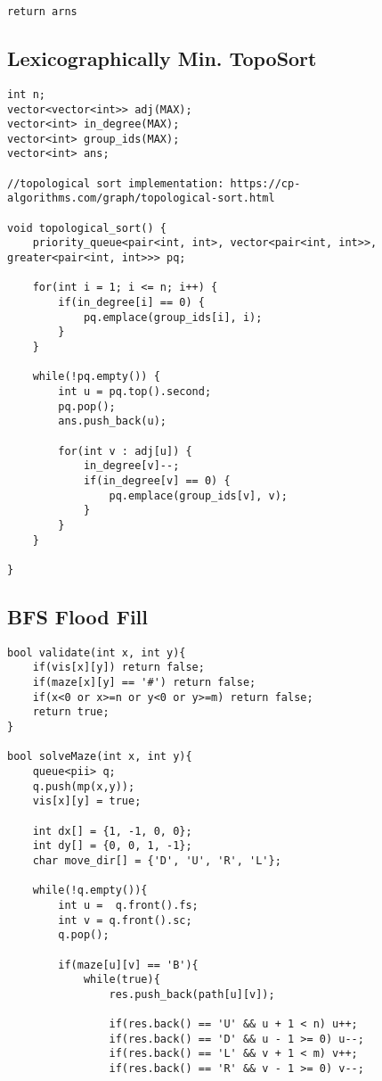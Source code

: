 \documentclass[10pt]{article}
\begin{document}
\begin{multicols*}{2}
\begin{lstlisting}[style=compactcpp]
        return arns
\end{lstlisting}

\subsection{Lexicographically Min. TopoSort}

\begin{lstlisting}[style=compactcpp]
int n;
vector<vector<int>> adj(MAX);
vector<int> in_degree(MAX);
vector<int> group_ids(MAX);
vector<int> ans;

//topological sort implementation: https://cp-algorithms.com/graph/topological-sort.html

void topological_sort() {
    priority_queue<pair<int, int>, vector<pair<int, int>>, greater<pair<int, int>>> pq;

    for(int i = 1; i <= n; i++) {
        if(in_degree[i] == 0) {
            pq.emplace(group_ids[i], i);
        }
    }

    while(!pq.empty()) {
        int u = pq.top().second;
        pq.pop();
        ans.push_back(u);

        for(int v : adj[u]) {
            in_degree[v]--;
            if(in_degree[v] == 0) {
                pq.emplace(group_ids[v], v);
            }
        }
    }

}
\end{lstlisting}

\subsection{BFS Flood Fill}

\begin{lstlisting}[style=compactcpp]
    bool validate(int x, int y){
	if(vis[x][y]) return false;
	if(maze[x][y] == '#') return false;
	if(x<0 or x>=n or y<0 or y>=m) return false;
	return true;
}
 
bool solveMaze(int x, int y){
    queue<pii> q;
    q.push(mp(x,y));
    vis[x][y] = true;

    int dx[] = {1, -1, 0, 0};
    int dy[] = {0, 0, 1, -1};
    char move_dir[] = {'D', 'U', 'R', 'L'};
 
	while(!q.empty()){
		int u =  q.front().fs;
		int v = q.front().sc;
		q.pop();
 
		if(maze[u][v] == 'B'){
			while(true){
				res.push_back(path[u][v]);
 
				if(res.back() == 'U' && u + 1 < n) u++;
				if(res.back() == 'D' && u - 1 >= 0) u--;
				if(res.back() == 'L' && v + 1 < m) v++;
				if(res.back() == 'R' && v - 1 >= 0) v--;
 

\end{lstlisting}
\end{multicols*}
\end{document}
